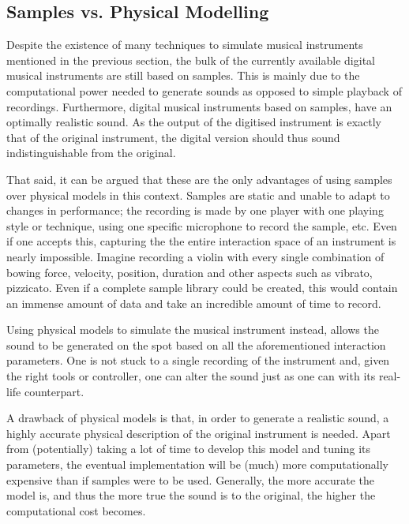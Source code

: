 \subsection{Samples vs. Physical Modelling}
Despite the existence of many techniques to simulate musical instruments mentioned in the previous section, the bulk of the currently available digital musical instruments are still based on samples. This is mainly due to the computational power needed to generate sounds as opposed to simple playback of recordings. Furthermore, digital musical instruments based on samples, have an optimally realistic sound. As the output of the digitised instrument is exactly that of the original instrument, the digital version should thus sound indistinguishable from the original.

That said, it can be argued that these are the only advantages of using samples over physical models in this context. Samples are static and unable to adapt to changes in performance; the recording is made by one player with one playing style or technique, using one specific microphone to record the sample, etc. Even if one accepts this, capturing the the entire interaction space of an instrument is nearly impossible. Imagine recording a violin with every single combination of bowing force, velocity, position, duration and other aspects such as vibrato, pizzicato. Even if a complete sample library could be created, this would contain an immense amount of data and take an incredible amount of time to record. 

Using physical models to simulate the musical instrument instead, allows the sound to be generated on the spot based on all the aforementioned interaction parameters. One is not stuck to a single recording of the instrument and, given the right tools or controller, one can alter the sound just as one can with its real-life counterpart.

A drawback of physical models is that, in order to generate a realistic sound, a highly accurate physical description of the original instrument is needed. Apart from (potentially) taking a lot of time to develop this model and tuning its parameters, the eventual implementation will be (much) more computationally expensive than if samples were to be used. Generally, the more accurate the model is, and thus the more true the sound is to the original, the higher the computational cost becomes. 

